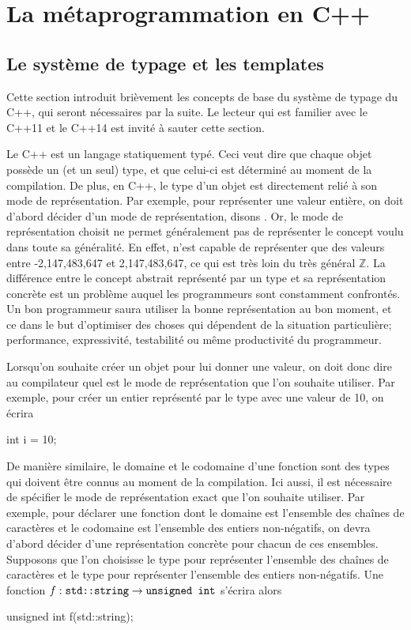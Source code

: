 \newcommand{\MPL}{http://www.boost.org/doc/libs/release/libs/mpl/doc/index.html}
\newcommand{\Hana}{http://ldionne.github.io/hana}

\section{La métaprogrammation en C++}


\subsection{Le système de typage et les templates}
Cette section introduit brièvement les concepts de base du système de typage
du C++, qui seront nécessaires par la suite. Le lecteur qui est familier avec
le C++11 et le C++14 est invité à sauter cette section.

Le C++ est un langage statiquement typé. Ceci veut dire que chaque objet
possède un (et un seul) type, et que celui-ci est déterminé au moment de la
compilation. De plus, en C++, le type d'un objet est directement relié à son
mode de représentation. Par exemple, pour représenter une valeur entière, on
doit d'abord décider d'un mode de représentation, disons . Or, le mode
de représentation choisit ne permet généralement pas de représenter le concept
voulu dans toute sa généralité. En effet,  n'est capable de représenter
que des valeurs entre -2,147,483,647 et 2,147,483,647, ce qui est très loin
du très général $\mathbb{Z}$. La différence entre le concept abstrait
représenté par un type et sa représentation concrète est un problème auquel
les programmeurs sont constamment confrontés. Un bon programmeur saura
utiliser la bonne représentation au bon moment, et ce dans le but d'optimiser
des choses qui dépendent de la situation particulière; performance,
expressivité, testabilité ou même productivité du programmeur.

Lorsqu'on souhaite créer un objet pour lui donner une valeur, on doit donc
dire au compilateur quel est le mode de représentation que l'on souhaite
utiliser. Par exemple, pour créer un entier représenté par le type 
avec une valeur de 10, on écrira
\begin{cpp}
    int i = 10;
\end{cpp}

De manière similaire, le domaine et le codomaine d'une fonction sont des
types qui doivent être connus au moment de la compilation. Ici aussi, il
est nécessaire de spécifier le mode de représentation exact que l'on souhaite
utiliser. Par exemple, pour déclarer une fonction dont le domaine est
l'ensemble des chaînes de caractères et le codomaine est l'ensemble des
entiers non-négatifs, on devra d'abord décider d'une représentation concrète
pour chacun de ces ensembles. Supposons que l'on choisisse le type
 pour représenter l'ensemble des chaînes de caractères et le
type  pour représenter l'ensemble des entiers non-négatifs.
Une fonction $f : \text{{\tt std::string}} \to \text{{\tt unsigned int}}$
s'écrira alors
\begin{cpp}
    unsigned int f(std::string);
\end{cpp}

